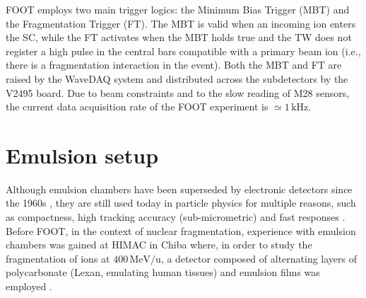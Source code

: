 FOOT employs two main trigger logics: the Minimum Bias Trigger (MBT) and the Fragmentation Trigger (FT). The MBT is valid when an incoming ion enters the SC, while the FT activates when the MBT holds true and the TW does not register a high pulse in the central bars compatible with a primary beam ion (i.e., there is a fragmentation interaction in the event). Both the MBT and FT are raised by the WaveDAQ system and distributed across the subdetectors by the V2495 board. Due to beam constraints and to the slow reading of M28 sensors, the current data acquisition rate of the FOOT experiment is $\simeq1\,\mathrm{kHz}$.
\section{Emulsion setup}\label{sec:emulsion_setup}
Although emulsion chambers have been superseded by electronic detectors since the 1960s \cite{Ariga2020}, they are still used today in particle physics for multiple reasons, such as compactness, high tracking accuracy (sub-micrometric) and fast responses \cite{measurement_impact_foot}. Before FOOT, in the context of nuclear fragmentation, experience with emulsion chambers was gained at HIMAC in Chiba where, in order to study the fragmentation of  ions at $400\,\mathrm{MeV/u}$, a detector composed of alternating layers of polycarbonate (Lexan, emulating human tissues) and emulsion films was employed \cite{articleNakamura,articleLellis1,articleLellis2}.

